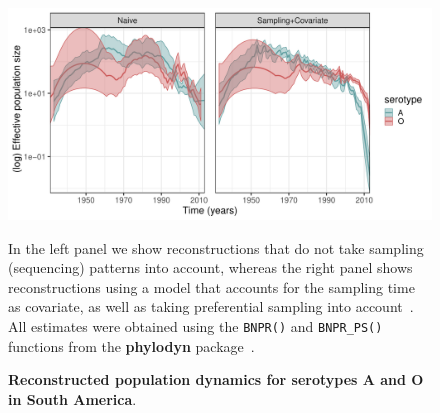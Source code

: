\documentclass[10pt]{article}
\begin{document}
\begin{figure}[!ht]
\begin{center}
\includegraphics[scale=0.6]{FIGURES/PLOTS/population_size_reconstructions_full.pdf}
\end{center}
\caption{\textbf{Reconstructed population dynamics for serotypes A and O in South America}.
}
In the left panel we show reconstructions that do not take sampling (sequencing) patterns into account, whereas the right panel shows reconstructions using a model that accounts for the sampling time as covariate, as well as taking preferential sampling into account~\citep{Karcher2019}.
All estimates were obtained using the \verb|BNPR()| and \verb|BNPR_PS()| functions from the \textbf{phylodyn} package~\citep{Karcher2017}. 
\label{fig:popdyn}
\end{figure}
\end{document}
